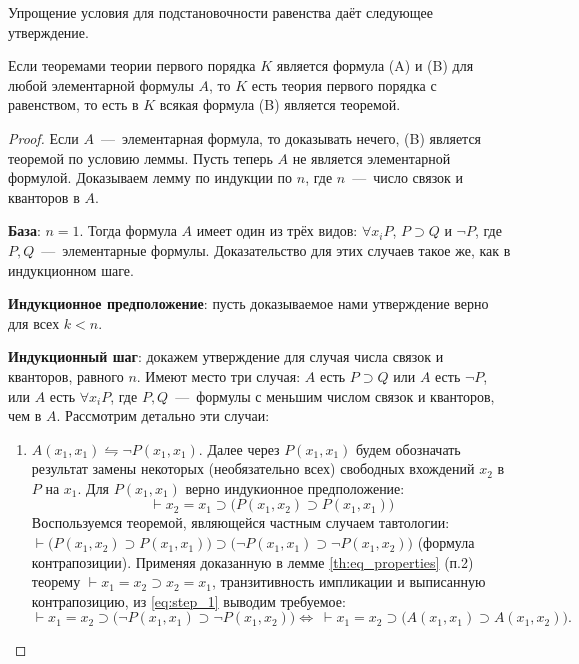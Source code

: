 Упрощение условия для подстановочности равенства даёт следующее утверждение.
\begin{lemma}
    Если теоремами теории первого порядка $K$ является формула (A) и (B) для любой элементарной формулы $A$, то $K$ есть теория первого порядка с равенством, то есть в $K$ всякая формула (B) является теоремой.
\end{lemma}
\begin{proof}
    Если $A$~---~элементарная формула, то доказывать нечего, (B) является теоремой по условию леммы. Пусть теперь $A$ не является элементарной формулой. Доказываем лемму по индукции по $n$, где $n$~---~число связок и кванторов в $A$.

    \textbf{База}: $n = 1$. Тогда формула $A$ имеет один из трёх видов: $\forall x_iP$, $P \supset Q$ и $\neg P$, где $P, Q$~---~элементарные формулы. Доказательство для этих случаев такое же, как в индукционном шаге.

    \textbf{Индукционное предположение}: пусть доказываемое нами утверждение верно для всех $k < n$.

    \textbf{Индукционный шаг}: докажем утверждение для случая числа связок и кванторов, равного $n$. Имеют место три случая: $A$ есть $P \supset Q$ или $A$ есть $\neg P$, или $A$ есть $\forall x_iP$, где $P, Q$~---~формулы с меньшим числом связок и кванторов, чем в $A$. Рассмотрим детально эти случаи:
    \begin{enumerate}
        \item \underline{$A(x_1, x_1) \leftrightharpoons \neg P(x_1, x_1)$}. Далее через $P(x_1, x_1)$ будем обозначать результат замены некоторых (необязательно всех) свободных вхождений $x_2$ в $P$ на $x_1$. Для $P(x_1, x_1)$ верно индукионное предположение:
        \begin{equation}\label{eq:step_1}
            \vdash x_2 = x_1 \supset \big(P(x_1, x_2) \supset P(x_1, x_1)\big)
        \end{equation}
        Воспользуемся теоремой, являющейся частным случаем тавтологии: $\vdash \big(P(x_1, x_2) \supset P(x_1, x_1)\big) \supset \big(\neg P(x_1, x_1) \supset \neg P(x_1, x_2)\big)$ (формула контрапозиции). Применяя доказанную в лемме \ref{th:eq_properties} (п.2) теорему $\vdash x_1 = x_2 \supset x_2 = x_1$, транзитивность импликации и выписанную контрапозицию, из \eqref{eq:step_1} выводим требуемое:
        \[
            \vdash x_1 = x_2 \supset \big(\neg P(x_1, x_1) \supset \neg P(x_1, x_2)\big) \Longleftrightarrow\ \vdash x_1 = x_2 \supset \big(A(x_1, x_1) \supset A(x_1, x_2)\big).
        \]


\end{enumerate}
\end{proof}
